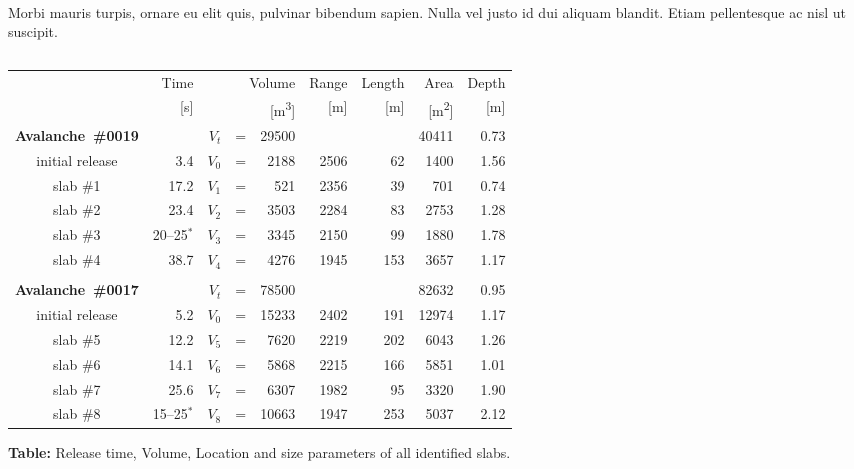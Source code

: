 \documentclass[unknownkeysallowed,usepdftitle=false, aspectratio=169, parskip=full]{beamer}
\begin{document}
\begin{frame}\label{slabtable}
\begin{columns}
\begin{column}[t]{1.1\textwidth}
\hyperlink{slab}{}\\
Morbi mauris turpis, ornare eu elit quis, pulvinar bibendum sapien. Nulla vel justo id dui aliquam blandit. Etiam pellentesque ac nisl ut suscipit. 



\vspace{0.3cm}
\end{column}
\end{columns}
 \begin{tabular}{c|rr@{}c@{}rrrrr}
 \setlength{\tabcolsep}{6mm}
   & Time & \multicolumn{3}{r}{Volume} & Range & Length & Area & Depth \\
   & [\si{\second}] & \multicolumn{3}{r}{[\si{\cubic\metre}]} & [\si{\metre}] &
[\si{\metre}] & [\si{\square\metre}] & [\si{\metre}]\\\hline

   \textbf{Avalanche~\#0019} & & $V_t$ &=& 29500 & & & 40411 & 0.73 \\
   initial release &3.4& $V_0$ &=& 2188 & 2506 &  62 &  1400 & 1.56 \\
   slab \#1 & 17.2    &  $V_1$ &=&  521 & 2356 &  39 &   701 & 0.74 \\
   slab \#2 & 23.4    &  $V_2$ &=& 3503 & 2284 &  83 &  2753 & 1.28 \\
   slab \#3 & 20--25$^*$ &  $V_3$ &=& 3345 & 2150 &  99 &  1880 & 1.78 \\
   slab \#4 & 38.7    &  $V_4$ &=& 4276 & 1945 & 153 &  3657 & 1.17 \\
   \\
   \textbf{Avalanche~\#0017} & &  $V_t$ &=& 78500 & & & 82632 & 0.95\\
   initial release&5.2&  $V_0$ &=& 15233 & 2402 & 191 & 12974 & 1.17\\
   slab \#5 & 12.2    &  $V_5$ &=&  7620 & 2219 & 202 &  6043 & 1.26 \\
   slab \#6 & 14.1    &  $V_6$ &=&  5868 & 2215 & 166 &  5851 & 1.01 \\
   slab \#7 & 25.6    &  $V_7$ &=&  6307 & 1982 &  95 &  3320 & 1.90 \\
   slab \#8 & 15--25$^*$ &  $V_8$ &=& 10663 & 1947 & 253 &  5037 & 2.12
 \end{tabular}
 
\vspace{0.2cm}
 \textbf{Table:} Release time, Volume, Location and size parameters of all
identified slabs.

\end{frame}
\end{document}
